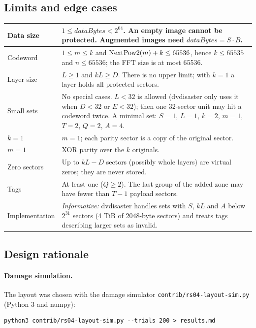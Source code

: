 \subsection{Limits and edge cases}
\label{rs04-limits}

\begin{tabular}{|p{4.2cm}|p{10.3cm}|}
\hline
Data size & $1 \le dataBytes < 2^{64}$. An empty image cannot be protected.
Augmented images need $dataBytes = S \cdot B$. \\
\hline
Codeword & $1 \le m \le k$ and ${\rm NextPow2}(m) + k \le 65536$, hence
$k \le 65535$ and $n \le 65536$; the FFT size is at most 65536. \\
\hline
Layer size & $L \ge 1$ and $kL \ge D$. There is no upper limit; with
$k = 1$ a layer holds all protected sectors. \\
\hline
Small sets & No special cases. $L < 32$ is allowed (dvdisaster only uses it
when $D < 32$ or $E < 32$); then one 32-sector unit may hit a codeword
twice. A minimal set: $S = 1$, $L = 1$, $k = 2$, $m = 1$, $T = 2$,
$Q = 2$, $A = 4$. \\
\hline
$k = 1$ & $m = 1$; each parity sector is a copy of the original sector. \\
\hline
$m = 1$ & XOR parity over the $k$ originals. \\
\hline
Zero sectors & Up to $kL - D$ sectors (possibly whole layers) are virtual
zeros; they are never stored. \\
\hline
Tags & At least one ($Q \ge 2$). The last group of the added zone may
have fewer than $T-1$ payload sectors. \\
\hline
Implementation & {\em Informative:} dvdisaster handles sets with
$S$, $kL$ and $A$ below $2^{31}$ sectors (4 TiB of 2048-byte sectors) and
treats tags describing larger sets as invalid. \\
\hline
\end{tabular}

\subsection{Design rationale}
\label{rs04-rationale}

\paragraph{Damage simulation.} The layout was chosen with the damage
simulator {\tt contrib/rs04-layout-sim.py} (Python 3 and numpy):

{\small
\begin{verbatim}
python3 contrib/rs04-layout-sim.py --trials 200 > results.md
\end{verbatim}
}

